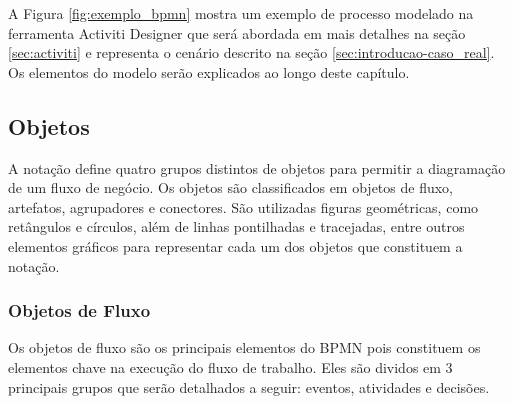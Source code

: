 A Figura \ref{fig:exemplo_bpmn} mostra um exemplo de processo modelado na ferramenta Activiti Designer que será abordada em mais detalhes na seção \ref{sec:activiti} e representa o cenário descrito na seção \ref{sec:introducao-caso_real}. Os elementos do modelo serão explicados ao longo deste capítulo.


\subsection{Objetos}\label{sec:bpm-bpmn_objetos}

A notação define quatro grupos distintos de objetos para permitir a diagramação de um fluxo de negócio. Os objetos são classificados em objetos de fluxo, artefatos, agrupadores e conectores. São utilizadas figuras geométricas, como retângulos e círculos, além de linhas pontilhadas e tracejadas, entre outros elementos gráficos para representar cada um dos objetos que constituem a notação.

\subsubsection{Objetos de Fluxo}\label{sec:bpm-bpmn_objetos_fluxo}

Os objetos de fluxo são os principais elementos do BPMN pois constituem os elementos chave na execução do fluxo de trabalho. Eles são dividos em 3 principais grupos que serão detalhados a seguir: eventos, atividades e decisões.


